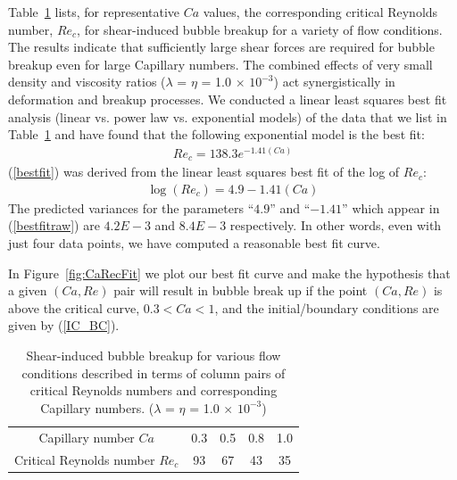 \documentclass[%
 reprint,
 showkeys,
 amsmath,amssymb,
 aps,
 prfluids,
 onecolumn
]{revtex4-2}
\begin{document}
Table~\ref{tab:CaRecComparison} 
lists, for representative $Ca$ values,
the corresponding critical Reynolds number, $Re_{c}$, for shear-induced 
bubble breakup for a variety of flow
conditions.  The results indicate that sufficiently large shear forces are
required for bubble breakup even for large Capillary numbers. The combined
effects of very small density and viscosity ratios 
($\lambda$ = $\eta$ = 1.0 $\times$ $10^{-3}$) 
act synergistically in deformation and breakup processes.
We conducted a linear least squares best fit analysis (linear vs. 
power law vs. exponential models) of the data that we 
list in Table~\ref{tab:CaRecComparison} and have found that the following
exponential model is the best fit:
\begin{eqnarray}
Re_{c}=138.3 e^{-1.41 (Ca)} \label{bestfit}
\end{eqnarray}
(\ref{bestfit}) was derived from the linear least squares best fit
of the log of $Re_{c}$:
\begin{eqnarray}
	\log(Re_{c})=4.9-1.41 (Ca)  \label{bestfitraw}
\end{eqnarray}
The predicted variances for the parameters 
``$4.9$'' and ``$-1.41$'' which appear in (\ref{bestfitraw}) are
$4.2E-3$ and $8.4E-3$ respectively.  In other words, even with just
four data points, we have computed a reasonable best fit curve.

In Figure~\ref{fig:CaRecFit} we plot our best fit curve and make the
hypothesis that a given $(Ca,Re)$ pair will result in bubble break up
if the point $(Ca,Re)$ is above the critical curve, 
$0.3<Ca<1$, and the initial/boundary conditions are given
by (\ref{IC_BC}).

%
\begin{table}[tbh]
\caption{Shear-induced bubble breakup for various flow 
	conditions described in terms
        of column pairs of critical Reynolds numbers and 
	corresponding Capillary numbers.
        ($\lambda$ = $\eta$ = 1.0 $\times$ $10^{-3}$) 
	}
\label{tab:CaRecComparison}
\footnotesize
\center
\begin{tabular}{ c  c  c  c  c }
\hline
\hline
Capillary number $Ca$            & 0.3  & 0.5  & 0.8  & 1.0  \\
Critical Reynolds number $Re_c$  & 93   & 67   & 43   & 35   \\
\hline
\hline
\end{tabular}
\end{table}
\end{document}
